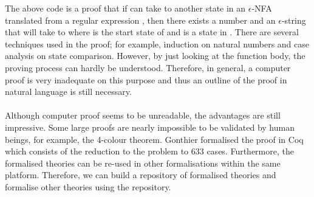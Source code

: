 \par The above code is a proof that if  can take  to
another state  in an \(\epsilon\)-NFA translated from a
regular expression , then there exists a number  and
an \(\epsilon\)-string  that will take  to  where
 is the start state of  and  is a state in
. There are several techniques used in the proof; for example,
induction on natural numbers and case analysis on state comparison. However, by
just looking at the function body, the proving process can hardly be
understood. Therefore, in general, a computer proof is very inadequate on
this purpose and thus an outline of the proof in natural language is
still necessary. 

\paragraph{} Although computer proof seems to be unreadable, the advantages
are still impressive. Some large proofs are nearly impossible
to be validated by human beings, for example, the 4-colour
theorem. Gonthier \cite{gonthier2008} formalised the proof in Coq
which consists of the reduction to the problem to 633
cases. Furthermore, the formalised theories can be re-used in other
formalisations within the same platform. Therefore, we can build a
repository of formalised theories and formalise other theories using the repository. 


